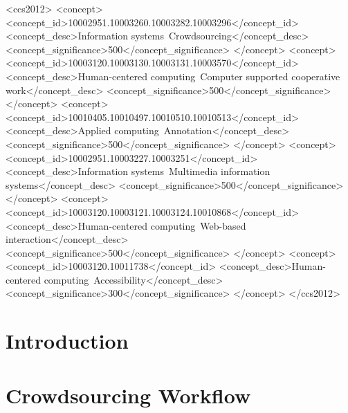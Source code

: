 \documentclass[sigconf]{acmart}
\begin{document}
%
%
\begin{CCSXML}
<ccs2012>
<concept>
<concept_id>10002951.10003260.10003282.10003296</concept_id>
<concept_desc>Information systems~Crowdsourcing</concept_desc>
<concept_significance>500</concept_significance>
</concept>
<concept>
<concept_id>10003120.10003130.10003131.10003570</concept_id>
<concept_desc>Human-centered computing~Computer supported cooperative work</concept_desc>
<concept_significance>500</concept_significance>
</concept>
<concept>
<concept_id>10010405.10010497.10010510.10010513</concept_id>
<concept_desc>Applied computing~Annotation</concept_desc>
<concept_significance>500</concept_significance>
</concept>
<concept>
<concept_id>10002951.10003227.10003251</concept_id>
<concept_desc>Information systems~Multimedia information systems</concept_desc>
<concept_significance>500</concept_significance>
</concept>
<concept>
<concept_id>10003120.10003121.10003124.10010868</concept_id>
<concept_desc>Human-centered computing~Web-based interaction</concept_desc>
<concept_significance>500</concept_significance>
</concept>
<concept>
<concept_id>10003120.10011738</concept_id>
<concept_desc>Human-centered computing~Accessibility</concept_desc>
<concept_significance>300</concept_significance>
</concept>
</ccs2012>
\end{CCSXML}






\maketitle

\section{Introduction}
	

\section{Crowdsourcing Workflow}
	
\end{document}
